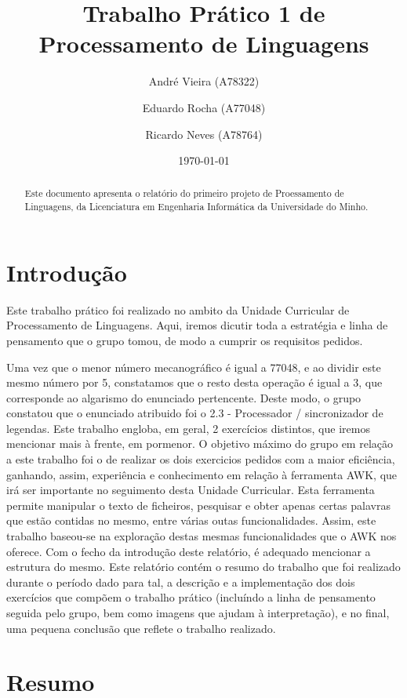 \documentclass[a4paper]{article}
\title{Trabalho Prático 1 de Processamento de Linguagens}
\author{André Vieira (A78322) \and Eduardo Rocha (A77048) \and Ricardo Neves (A78764)}
\date{\today}
\begin{document}
\maketitle

\begin{abstract}
  Este documento apresenta o relatório do primeiro projeto de 
  Proessamento de Linguagens, da Licenciatura em Engenharia Informática da 
  Universidade do Minho.
\end{abstract}

\tableofcontents

\section{Introdução}
\label{sec:intro}

Este trabalho prático foi realizado no ambito da Unidade Curricular de Processamento de Linguagens.
Aqui, iremos dicutir toda a estratégia e linha de pensamento que o grupo tomou, de modo a cumprir os requisitos pedidos.

Uma vez que o menor número mecanográfico é igual a 77048, e ao dividir este mesmo número por 5, constatamos que o resto desta operação é igual a 3, que corresponde ao algarismo do enunciado pertencente.
Deste modo, o grupo constatou que o enunciado atribuido foi o 2.3 - Processador / sincronizador de legendas.
Este trabalho engloba, em geral, 2 exercícios distintos, que iremos mencionar mais à frente, em pormenor.
O objetivo máximo do grupo em relação a este trabalho foi o de realizar os dois exercicios pedidos com a maior eficiência, ganhando, assim, experiência e conhecimento em relação à ferramenta AWK, que irá ser importante no seguimento desta Unidade Curricular. Esta ferramenta permite manipular o texto de ficheiros, pesquisar e obter apenas certas palavras que estão contidas no mesmo, entre várias outas funcionalidades. Assim, este trabalho baseou-se na exploração destas mesmas funcionalidades que o AWK nos oferece.
Com o fecho da introdução deste relatório, é adequado mencionar a estrutura do mesmo. Este relatório contém o resumo do trabalho que foi realizado durante o período dado para tal, a descrição e a implementação dos dois exercícios que compõem o trabalho prático (incluíndo a linha de pensamento seguida pelo grupo, bem como imagens que ajudam à interpretação), e no final, uma pequena conclusão que reflete o trabalho realizado.


\section{Resumo}
\label{sec:resumo}
\end{document}
